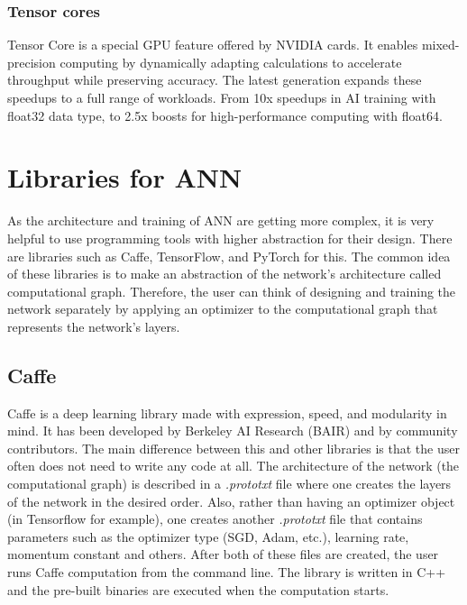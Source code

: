 \subsubsection{Tensor cores}

Tensor Core is a special GPU feature offered by NVIDIA cards. It enables mixed-precision computing by dynamically adapting calculations to accelerate throughput while preserving accuracy. The latest generation expands these speedups to a full range of workloads. From 10x speedups in AI training with float32 data type, to 2.5x boosts for high-performance computing with float64. \cite{nvidia}

\newpage
\section{Libraries for ANN}

As the architecture and training of ANN are getting more complex, it is very helpful to use programming tools with higher abstraction for their design. There are libraries such as Caffe, TensorFlow, and PyTorch for this. The common idea of these libraries is to make an abstraction of the network's architecture called computational graph. Therefore, the user can think of designing and training the network separately by applying an optimizer to the computational graph that represents the network's layers. \cite{stanford-L8}

\subsection{Caffe}

Caffe is a deep learning library made with expression, speed, and modularity in mind. It has been developed by Berkeley AI Research (BAIR) and by community contributors. \cite{caffe} The main difference between this and other libraries is that the user often does not need to write any code at all. The architecture of the network (the computational graph) is described in a \textit{.prototxt} file where one creates the layers of the network in the desired order. Also, rather than having an optimizer object (in Tensorflow for example), one creates another \textit{.prototxt} file that contains parameters such as the optimizer type (SGD, Adam, etc.), learning rate, momentum constant and others. After both of these files are created, the user runs Caffe computation from the command line. The library is written in C++ and the pre-built binaries are executed when the computation starts. \cite{stanford-L8}

